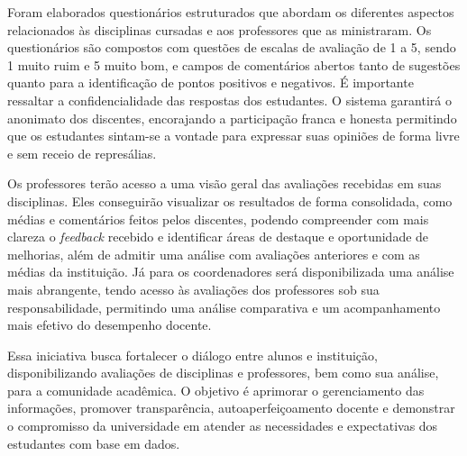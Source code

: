 Foram elaborados questionários estruturados que abordam os diferentes aspectos relacionados às disciplinas cursadas e aos professores que as ministraram. Os questionários são compostos com questões de escalas de avaliação de 1 a 5, sendo 1 muito ruim e 5 muito bom, e campos de comentários abertos tanto de sugestões quanto para a identificação de pontos positivos e negativos. É importante ressaltar a confidencialidade das respostas dos estudantes. O sistema garantirá o anonimato dos discentes, encorajando a participação franca e honesta permitindo que os estudantes sintam-se a vontade para expressar suas opiniões de forma livre e sem receio de represálias.


Os professores terão acesso a uma visão geral das avaliações recebidas em suas disciplinas. 
Eles conseguirão visualizar os resultados de forma consolidada, como médias e comentários feitos pelos discentes, podendo compreender com mais clareza o \textit{feedback} recebido e identificar áreas de destaque e oportunidade de melhorias, além de admitir uma análise com avaliações anteriores e com as médias da instituição. Já para os coordenadores será disponibilizada uma análise mais abrangente, tendo acesso às avaliações dos professores sob sua responsabilidade, permitindo uma análise comparativa e um acompanhamento mais efetivo do desempenho docente. 

Essa iniciativa busca fortalecer o diálogo entre alunos e instituição, disponibilizando avaliações de disciplinas e professores, bem como sua análise, para a comunidade acadêmica. O objetivo é aprimorar o gerenciamento das informações, promover transparência, autoaperfeiçoamento docente e demonstrar o compromisso da universidade em atender as necessidades e expectativas dos estudantes com base em dados.%








